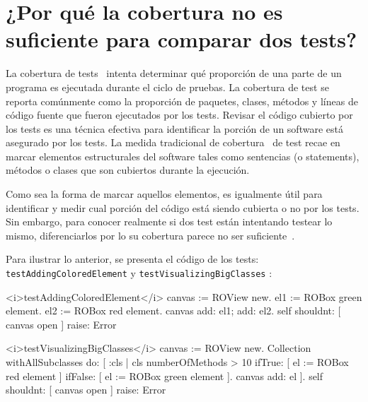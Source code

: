 



\section{¿Por qué la cobertura no es suficiente para comparar dos tests?}

\par La cobertura de tests~\cite{Horwi02a} intenta determinar qué proporción de una parte de un programa es ejecutada durante el ciclo de pruebas. La cobertura de test se reporta comúnmente como la proporción de paquetes, clases, métodos y líneas de código fuente que fueron ejecutados por los tests. Revisar el código cubierto por los tests es una técnica efectiva para identificar la porción de un software está asegurado por los tests. La medida tradicional de cobertura~\cite{Mock09a,Piwo93a} de test recae en marcar elementos estructurales del software tales como sentencias (o statements), métodos o clases que son cubiertos durante la ejecución.

\par Como sea la forma de marcar aquellos elementos, es igualmente útil para identificar y medir cual porción del código está siendo cubierta o no por los tests. Sin embargo, para conocer realmente si dos test están intentando testear lo mismo, diferenciarlos por lo su cobertura parece no ser suficiente~\cite{van2001refactoring,greiler2012test}.    

\par Para ilustrar lo anterior, se presenta el código de los tests: {\tt testAddingColoredElement} y {\tt testVisualizingBigClasses} :

\begin{codeWithLineNumbers}
<i>testAddingColoredElement</i>
	canvas := ROView new.
	el1 := ROBox green element.
	el2 := ROBox red element.
	canvas add: el1; add: el2.
	self shouldnt: [ canvas open ] raise: Error

<i>testVisualizingBigClasses</i>
	canvas := ROView new.
	Collection withAllSubclasses do: [ :cls |
		cls numberOfMethods > 10
			ifTrue: [ el := ROBox red element ]
			ifFalse: [ el := ROBox green element ].
		canvas add: el ].
	self shouldnt: [ canvas open ] raise: Error
\end{codeWithLineNumbers} 

